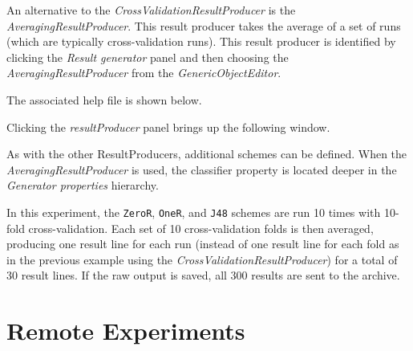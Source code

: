 \documentclass[a4paper]{article}
\begin{document}
An alternative to the \textit{CrossValidationResultProducer} is the \textit{AveragingResultProducer}. This result producer takes the average of a set of runs (which are typically cross-validation runs). This result producer is identified by clicking the \textit{Result generator} panel and then choosing the \textit{AveragingResultProducer} from the \textit{GenericObjectEditor}.
\begin{center}
\end{center}

The associated help file is shown below.
\begin{center}
\end{center}

Clicking the \textit{resultProducer} panel brings up the following window.
\begin{center}
\end{center}

As with the other ResultProducers, additional schemes can be defined. When the \textit{AveragingResultProducer} is used, the classifier property is located deeper in the \textit{Generator properties} hierarchy.
\begin{center}
\end{center}
	
\begin{center}
\end{center}

In this experiment, the \texttt{ZeroR}, \texttt{OneR}, and \texttt{J48} schemes are run 10 times with 10-fold cross-validation. Each set of 10 cross-validation folds is then averaged, producing one result line for each run (instead of one result line for each fold as in the previous example using the \textit{CrossValidationResultProducer}) for a total of 30 result lines. If the raw output is saved, all 300 results are sent to the archive.
\begin{center}
\end{center}



\newpage
\section{Remote Experiments}
\end{document}
